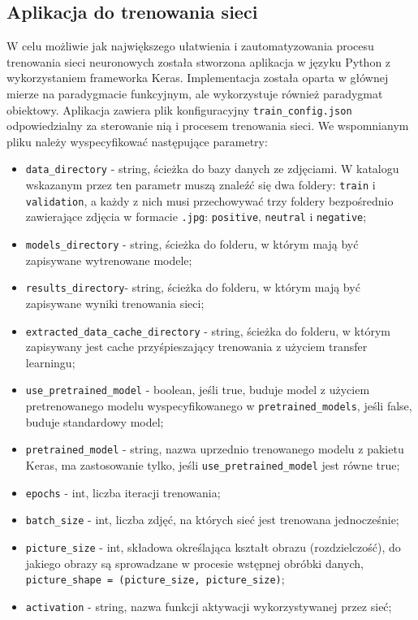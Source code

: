 \subsection{Aplikacja do trenowania sieci}
W celu możliwie jak największego ułatwienia i zautomatyzowania procesu trenowania sieci neuronowych została stworzona aplikacja w języku Python z wykorzystaniem frameworka Keras. Implementacja została oparta w głównej mierze na paradygmacie funkcyjnym, ale wykorzystuje również paradygmat obiektowy. Aplikacja zawiera plik konfiguracyjny \verb|train_config.json| odpowiedzialny za sterowanie nią i procesem trenowania sieci. We wspomnianym pliku należy wyspecyfikować następujące parametry:
\begin{itemize}
    \item \verb|data_directory| - string, ścieżka do bazy danych ze zdjęciami. W katalogu wskazanym przez ten parametr muszą znaleźć się dwa foldery: \verb|train| i \verb|validation|, a każdy z nich musi przechowywać trzy foldery bezpośrednio zawierające zdjęcia w formacie \verb|.jpg|: \verb|positive|, \verb|neutral| i \verb|negative|;
    \item \verb|models_directory| - string, ścieżka do folderu, w którym mają być zapisywane wytrenowane modele;
    \item \verb|results_directory|- string, ścieżka do folderu, w którym mają być zapisywane wyniki trenowania sieci;
    \item \verb|extracted_data_cache_directory| - string, ścieżka do folderu, w którym zapisywany jest cache przyśpieszający trenowania z użyciem transfer learningu;
    \item \verb|use_pretrained_model| - boolean, jeśli true, buduje model z użyciem pretrenowanego modelu wyspecyfikowanego w \verb|pretrained_models|, jeśli false, buduje standardowy model;
    \item \verb|pretrained_model| - string, nazwa uprzednio trenowanego modelu z pakietu Keras, ma zastosowanie tylko, jeśli \verb|use_pretrained_model| jest równe true;
    \item \verb|epochs| - int, liczba iteracji trenowania;
    \item \verb|batch_size| - int, liczba zdjęć, na których sieć jest trenowana jednocześnie;
    \item \verb|picture_size| - int, składowa określająca kształt obrazu (rozdzielczość), do jakiego obrazy są sprowadzane w procesie wstępnej obróbki danych, \verb|picture_shape = (picture_size, picture_size)|;
    \item \verb|activation| - string, nazwa funkcji aktywacji wykorzystywanej przez sieć;

\end{itemize}
